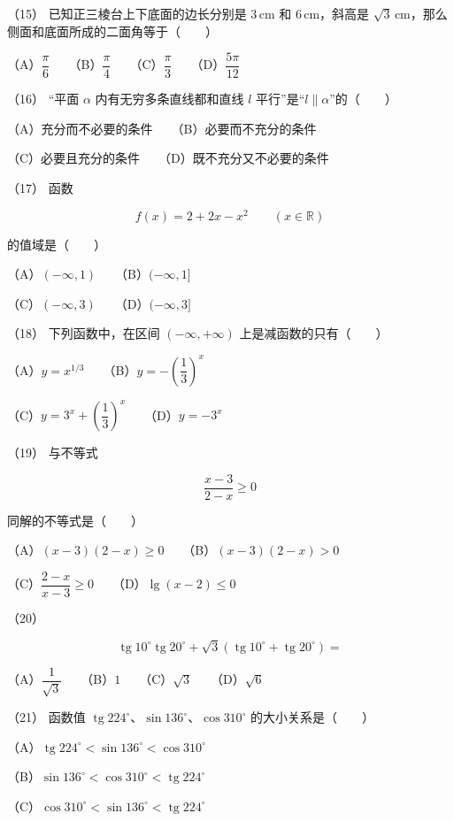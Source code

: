 \begin{question}
（15） 已知正三棱台上下底面的边长分别是 $3\,\mathrm{cm}$ 和 $6\,\mathrm{cm}$，斜高是 $\sqrt3\,\mathrm{cm}$，那么侧面和底面所成的二面角等于\mbox{（　　）}

（A）$\dfrac\pi6$　　（B）$\dfrac\pi4$　　（C）$\dfrac\pi3$　　（D）$\dfrac{5\pi}{12}$

（16） “平面 $\alpha$ 内有无穷多条直线都和直线 $l$ 平行”是“$l\parallel\alpha$”的\mbox{（　　）}

（A）充分而不必要的条件　　（B）必要而不充分的条件

（C）必要且充分的条件　　（D）既不充分又不必要的条件

（17） 函数

\nopagebreak[4]
\[
f(x)=2+2x-x^2\qquad(x\in\mathbb R)
\]

的值域是\mbox{（　　）}

（A）$(-\infty,1)$　　（B）$(-\infty,1]$

（C）$(-\infty,3)$　　（D）$(-\infty,3]$

（18） 下列函数中，在区间 $(-\infty,+\infty)$ 上是减函数的只有\mbox{（　　）}

（A）$y=x^{1/3}$　　（B）$y=-\left(\dfrac13\right)^x$

（C）$y=3^x+\left(\dfrac13\right)^x$　　（D）$y=-3^x$

（19） 与不等式

\nopagebreak[4]
\[
\frac{x-3}{2-x}\ge0
\]

同解的不等式是\mbox{（　　）}

（A）$(x-3)(2-x)\ge0$　　（B）$(x-3)(2-x)>0$

（C）$\dfrac{2-x}{x-3}\ge0$　　（D）$\lg(x-2)\le0$

（20）　

\nopagebreak[4]
\[
\operatorname{tg}10^\circ\operatorname{tg}20^\circ
+\sqrt3\left(\operatorname{tg}10^\circ+\operatorname{tg}20^\circ\right)=
\]

（A）$\dfrac1{\sqrt3}$　　（B）$1$　　（C）$\sqrt3$　　（D）$\sqrt6$

（21） 函数值 $\operatorname{tg}224^\circ\text{、}\sin136^\circ\text{、}\cos310^\circ$ 的大小关系是\mbox{（　　）}

（A）$\operatorname{tg}224^\circ<\sin136^\circ<\cos310^\circ$

（B）$\sin136^\circ<\cos310^\circ<\operatorname{tg}224^\circ$

（C）$\cos310^\circ<\sin136^\circ<\operatorname{tg}224^\circ$


\end{question}
